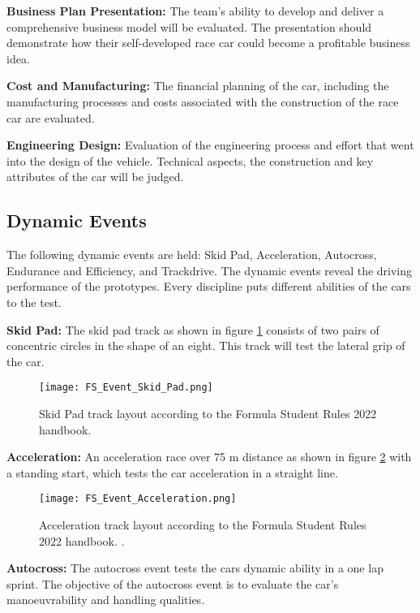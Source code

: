 \textbf{Business Plan Presentation:} The team's ability to develop and deliver a comprehensive business model will be evaluated. The presentation should demonstrate how their self-developed race car could become a profitable business idea.

\textbf{Cost and Manufacturing:} The financial planning of the car, including the manufacturing processes and costs associated with the construction of the race car are evaluated.

\textbf{Engineering Design:} Evaluation of the engineering process and effort that went into the design of the vehicle. Technical aspects, the construction and key attributes of the car will be judged.

\subsection{Dynamic Events} \label{sec:Dynamic Events}
The following dynamic events are held: Skid Pad, Acceleration, Autocross, Endurance and Efficiency, and Trackdrive.
The dynamic events reveal the driving performance of the prototypes. Every discipline puts different abilities of the cars to the test. \cite{fs_rules_2022_handbook}

\textbf{Skid Pad:} The skid pad track as shown in figure \ref{fig:FS Skid Pad layout} consists of two pairs of concentric circles in the shape of an eight. This track will test the lateral grip of the car.
\begin{figure}[H]
    \centering
    \texttt{[image: FS\_Event\_Skid\_Pad.png]}
    \caption{Skid Pad track layout according to the Formula Student Rules 2022 handbook. \cite{fs_rules_2022_handbook}}
    \label{fig:FS Skid Pad layout}
\end{figure}

\textbf{Acceleration:} An acceleration race over 75 m distance as shown in figure \ref{fig:FS Acceleration layout} with a standing start, which tests the car acceleration in a straight line.
\begin{figure}[H]
    \centering
    \texttt{[image: FS\_Event\_Acceleration.png]}
    \caption{Acceleration track layout according to the Formula Student Rules 2022 handbook. \cite{fs_rules_2022_handbook}.}
    \label{fig:FS Acceleration layout}
\end{figure}

\textbf{Autocross:} The autocross event tests the cars dynamic ability in a one lap sprint. The objective of the autocross event is to evaluate the car's manoeuvrability and handling qualities.

